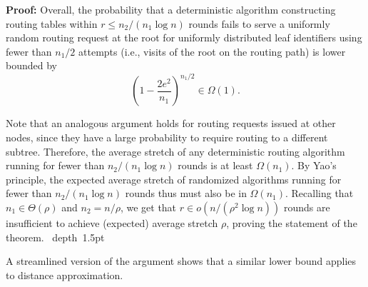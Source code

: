 \documentclass[letterpaper,11pt]{article}
\newcommand{\blackslug}{\hbox{\hskip 1pt \vrule width 4pt height 8pt
depth 1.5pt \hskip 1pt}}
\newcommand{\QED}{\quad\blackslug\lower 8.5pt\null\par}
\newenvironment{proof}[1][Proof:]{\noindent \textbf{#1}\xspace}{\QED}
\begin{document}
\begin{proof}
Overall, the probability that a deterministic algorithm constructing routing
tables within $r\leq n_2/(n_1\log n)$ rounds fails to serve a uniformly random
routing request at the root for uniformly distributed leaf identifiers using
fewer than $n_1/2$ attempts (i.e., visits of the root on the routing path) is
lower bounded by
\begin{equation*}
\left(1-\frac{2e^2}{n_1}\right)^{n_1/2}\in \Omega(1).
\end{equation*}

Note that an analogous argument holds for routing requests issued at other
nodes, since they have a large probability to require routing to a different
subtree. Therefore, the average stretch of any deterministic routing
algorithm running for fewer than $n_2/(n_1\log n)$ rounds is at least
$\Omega(n_1)$. By Yao's principle, the expected average stretch of randomized
algorithms running for fewer than $n_2/(n_1\log n)$ rounds thus must also be
in $\Omega(n_1)$. Recalling that $n_1\in \Theta(\rho)$ and $n_2 = n/\rho$, we
get that $r\in o(n/(\rho^2\log n))$ rounds are insufficient to achieve
(expected) average stretch $\rho$, proving the statement of the theorem.
\end{proof}

A streamlined version of  the argument shows that a similar lower
bound applies to distance approximation.
\end{document}

